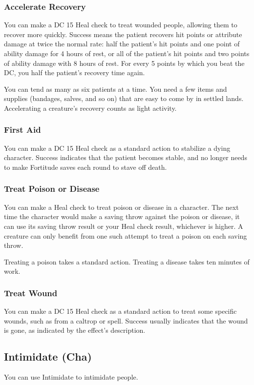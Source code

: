 \subsubsection{Accelerate Recovery}
You can make a DC 15 Heal check to treat wounded people, allowing them to recover more quickly. Success means the patient recovers hit points or attribute damage at twice the normal rate: half the patient's hit points and one point of ability damage for 4 hours of rest, or all of the patient's hit points and two points of ability damage with 8 hours of rest. For every 5 points by which you beat the DC, you half the patient's recovery time again.

You can tend as many as six patients at a time. You need a few items and supplies (bandages, salves, and so on) that are easy to come by in settled lands. Accelerating a creature's recovery counts as light activity. %

\subsubsection{First Aid}
You can make a DC 15 Heal check as a standard action to stabilize a dying character. Success indicates that the patient becomes stable, and no longer needs to make Fortitude saves each round to stave off death. 

\subsubsection{Treat Poison or Disease}
You can make a Heal check to treat poison or disease in a character. The next time the character would make a saving throw against the poison or disease, it can use its saving throw result or your Heal check result, whichever is higher. A creature can only benefit from one such attempt to treat a poison on each saving throw.

Treating a poison takes a standard action. Treating a disease takes ten minutes of work.

\subsubsection{Treat Wound}
You can make a DC 15 Heal check as a standard action to treat some specific wounds, such as from a caltrop or  spell. Success usually indicates that the wound is gone, as indicated by the effect's description.

\subsection{Intimidate (Cha)}
You can use Intimidate to intimidate people.

